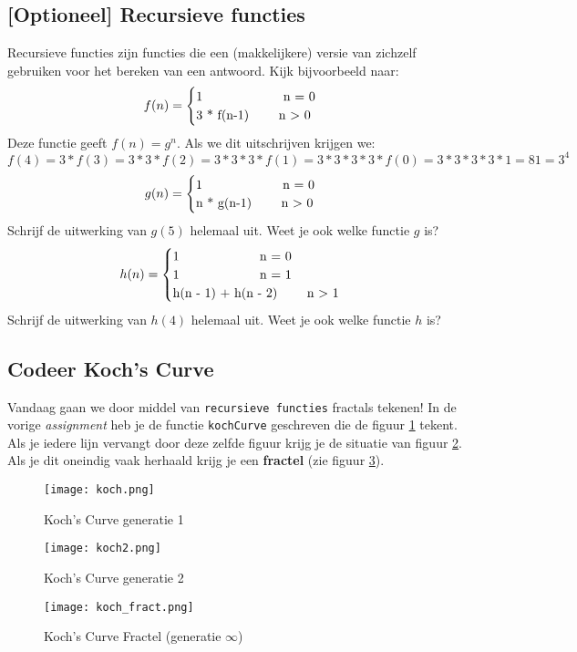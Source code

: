 \subsection{[Optioneel] Recursieve functies}
Recursieve functies zijn functies die een (makkelijkere) versie van zichzelf gebruiken voor het bereken van een antwoord. Kijk bijvoorbeeld naar:
\[f(n) = \begin{cases}
        $1 \qquad\qquad\qquad n = 0$\\
        $3 * f(n-1)  \qquad n $>$ 0$
    \end{cases}
   \]
Deze functie geeft $f(n) = g^n$. Als we dit uitschrijven krijgen we: $f(4) = 3 * f(3) = 3 * 3 * f(2) = 3 * 3 * 3 * f(1) = 3 * 3 * 3 * 3 * f(0) = 3 * 3 * 3 * 3 * 1 = 81 = 3^4$
\[g(n) = \begin{cases}
        $1 \qquad\qquad\qquad n = 0$\\
        $n * g(n-1)  \qquad n $>$ 0$
    \end{cases}
   \]
Schrijf de uitwerking van $g(5)$ helemaal uit. Weet je ook welke functie $g$ is?
\[h(n) = \begin{cases}
        $1 \qquad\qquad\qquad n = 0$\\
        $1 \qquad\qquad\qquad n = 1$\\
        $h(n - 1) + h(n - 2)  \qquad n $>$ 1$
    \end{cases}
   \]
Schrijf de uitwerking van $h(4)$ helemaal uit. Weet je ook welke functie $h$ is?

\subsection{Codeer Koch's Curve}
Vandaag gaan we door middel van \texttt{recursieve functies} fractals tekenen!
In de vorige \textit{assignment} heb je de functie \texttt{kochCurve} geschreven die de figuur \ref{fig:koch} tekent. Als je iedere lijn vervangt door deze zelfde figuur krijg je de situatie van figuur \ref{fig:koch2}. Als je dit oneindig vaak herhaald krijg je een \textbf{fractel} (zie figuur \ref{fig:koch_fract}).
\begin{figure}[H]
	\centering
	\texttt{[image: koch.png]}
	\caption{Koch's Curve generatie 1}
	\label{fig:koch}
\end{figure}
\begin{figure}[H]
	\centering
	\texttt{[image: koch2.png]}
	\caption{Koch's Curve generatie 2}
	\label{fig:koch2}
\end{figure}
\begin{figure}[H]
	\centering
	\texttt{[image: koch\_fract.png]}
	\caption{Koch's Curve Fractel (generatie $\infty$)}
	\label{fig:koch_fract}
\end{figure}

